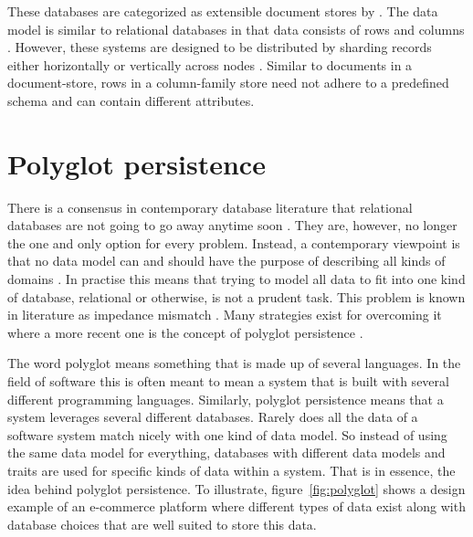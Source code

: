 These databases are categorized as extensible document stores by \cite{Catell}. The data model is similar to relational databases in that data consists of rows and columns \cite{Catell}. However, these systems are designed to be distributed by sharding records either horizontally or vertically across nodes \cite{10rules}. Similar to documents in a document-store, rows in a column-family store need not adhere to a predefined schema and can contain different attributes. 


\section{Polyglot persistence}
\label{sec:pp}
There is a consensus in contemporary database literature that relational databases are not going to go away anytime soon \cite{Catell, NoSQLDistilled, NoSQLSurvey}. They are, however, no longer the one and only option for every problem. Instead, a contemporary viewpoint is that no data model can and should have the purpose of describing all kinds of domains \cite{NoSQLDistilled, NoSQLSurvey}. In practise this means that trying to model all data to fit into one kind of database, relational or otherwise, is not a prudent task. This problem is known in literature as impedance mismatch \cite{ORM}. Many strategies \cite{ORM} exist for overcoming it where a more recent one is the concept of polyglot persistence \cite{NoSQLDistilled}. 

The word polyglot means something that is made up of several languages. In the field of software this is often meant to mean a system that is built with several different programming languages. Similarly, polyglot persistence means that a system leverages several different databases. Rarely does all the data of a software system match nicely with one kind of data model. So instead of using the same data model for everything, databases with different data models and traits are used for specific kinds of data within a system. That is in essence, the idea behind polyglot persistence. To illustrate, figure~\ref{fig:polyglot} shows a design example of an e-commerce platform where different types of data exist along with database choices that are well suited to store this data.



